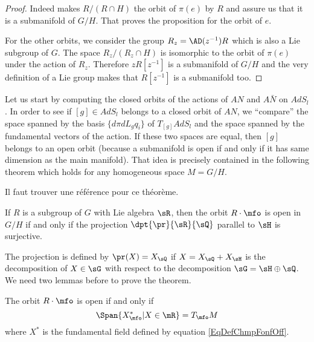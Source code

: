 \begin{proof}
 Indeed makes $R/(R\cap H)$ the orbit of $\pi(e)$ by $R$ and assure us that it is a submanifold of $G/H$. That proves the proposition for the orbit of $e$. 

For the other orbits, we consider the group $R_z=\AD(z^{-1})R$ which is also a Lie  subgroup of $G$. The space $R_z/(R_z\cap H)$ is isomorphic to the orbit of $\pi(e)$ under the action of $R_z$. Therefore $zR[z^{-1}]$ is a submanifold of $G/H$ and the very definition of a Lie group makes that  $R[z^{-1}]$ is a submanifold too.

\end{proof}

Let us start by computing the closed orbits of the actions of $AN$ and $A\bar{N}$ on $AdS_l$. In order to see if $[g]\in AdS_l$ belongs to a closed orbit of $AN$, we ``compare'' the space spanned by the basis $\{d\pi dL_g q_i\}$ of $T_{[g]}AdS_l$ and the space spanned by the fundamental vectors of the action. If these two spaces are equal, then $[g]$ belongs to an open orbit (because a submanifold is open if and only if it has same dimension as the main manifold). That idea is precisely contained in the following theorem which holds for any homogeneous space $M=G/H$.

\begin{probleme}
Il faut trouver une référence pour ce théorème.
\end{probleme}


\begin{theorem}
If $R$ is a subgroup of $G$ with Lie algebra $\sR$, then the orbit $R\cdot \mfo$ is open in $G/H$ if and only if the projection $\dpt{\pr}{\sR}{\sQ}$ parallel to $\sH$ is surjective.
\label{tho:pr_ouvert}
\end{theorem}

The projection is defined by $\pr(X)=X_{\sQ}$ if $X=X_{\sQ}+X_{\sH}$ is the decomposition of $X\in\sG$ with respect to the decomposition $\sG=\sH\oplus\sQ$. We need two lemmas before to prove the theorem.

\begin{lemma}
The orbit $R\cdot\mfo$ is open if and only if
\[
    \Span\{X^*_{\mfo}|X\in\mR\}=T_{\mfo}M
\]
where $X^*$ is the fundamental field defined by equation \eqref{EqDefChmpFonfOff}.
\label{lem:equiv_1}
\end{lemma}

